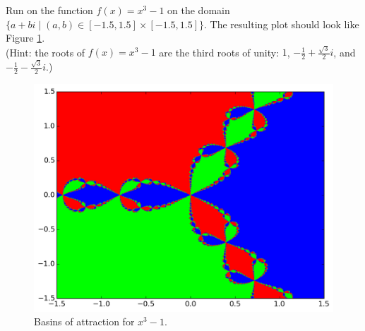 \begin{problem}

Run  on the function $f(x) = x^3-1$ on the domain $\{a+bi \mid (a, b) \in [-1.5, 1.5] \times [-1.5, 1.5] \}$.
The resulting plot should look like Figure \ref{fig:fractal_hw}.
\\ (Hint: the roots of $f(x) = x^3-1$ are the third roots of unity: $1$, $-\frac{1}{2} + \frac{\sqrt{3}}{2}i$, and $-\frac{1}{2} - \frac{\sqrt{3}}{2}i$.)

\begin{figure}[H]
    \centering
    \includegraphics[scale=0.66]{figures/fractal_hw.png}
    \caption{Basins of attraction for $x^3-1$.}
    \label{fig:fractal_hw}
\end{figure}
\end{problem}

